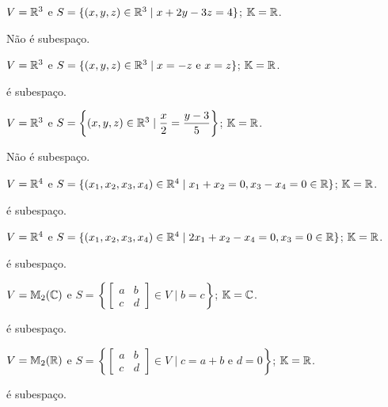 \documentclass[12pt]{exam}
\begin{document}
\begin{exercicio}
  $V = \mathbb{R}^3$ e $S = \{(x, y, z) \in \mathbb{R}^3 \mid x + 2y -3z = 4\}$; $\mathbb{K} = \mathbb{R}$.
  \begin{solucao}
    Não é subespaço.
  \end{solucao}
\end{exercicio}

\begin{exercicio}
  $V = \mathbb{R}^3$ e $S = \{(x, y, z) \in \mathbb{R}^3 \mid x = -z \mbox{ e } x = z\}$; $\mathbb{K} = \mathbb{R}$.
  \begin{solucao}
    é subespaço.
  \end{solucao}
\end{exercicio}

\begin{exercicio}
  $V = \mathbb{R}^3$ e $S = \left\{(x, y, z) \in \mathbb{R}^3 \mid \dfrac{x}{2} = \dfrac{y - 3}{5}\right\}$; $\mathbb{K} = \mathbb{R}$.
  \begin{solucao}
    Não é subespaço.
  \end{solucao}
\end{exercicio}

\begin{exercicio}
  $V = \mathbb{R}^4$ e $S = \{(x_1, x_2, x_3, x_4) \in \mathbb{R}^4 \mid x_1 + x_2 = 0, x_3 - x_4 = 0 \in \mathbb{R}\}$; $\mathbb{K} = \mathbb{R}$.
  \begin{solucao}
    é subespaço.
  \end{solucao}
\end{exercicio}

\begin{exercicio}
  $V = \mathbb{R}^4$ e $S = \{(x_1, x_2, x_3, x_4) \in \mathbb{R}^4 \mid 2x_1 + x_2 - x_4 = 0, x_3 = 0 \in \mathbb{R}\}$; $\mathbb{K} = \mathbb{R}$.
  \begin{solucao}
    é subespaço.
  \end{solucao}
\end{exercicio}

\begin{exercicio}
  $V = \mathbb{M}_2(\mathbb{C})$ e $S = \left\{\begin{bmatrix} a & b\\ c & d\end{bmatrix} \in V \mid b = c\right\}$; $\mathbb{K} = \mathbb{C}$.
  \begin{solucao}
    é subespaço.
  \end{solucao}
\end{exercicio}

\begin{exercicio}
  $V = \mathbb{M}_2(\mathbb{R})$ e $S = \left\{\begin{bmatrix} a & b\\ c & d\end{bmatrix} \in V \mid c = a + b \mbox{ e } d = 0\right\}$; $\mathbb{K} = \mathbb{R}$.
  \begin{solucao}
    é subespaço.
  \end{solucao}
\end{exercicio}
\end{document}
